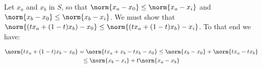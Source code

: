   Let $x_a$ and $x_b$ in $S$, so that $\norm{x_a - x_0} \leq \norm{x_a-x_i}$ and  $\norm{x_b - x_0} \leq \norm{x_b-x_i}$. We must show that $\norm{(tx_a + (1-t)x_b) - x_0} \leq  \norm{(tx_a + (1-t)x_b)-x_i}$. To that end we have:

\begin{gather*}
  \norm{tx_a + (1-t)x_b - x_0} = \norm{tx_a+x_b - tx_b -x_0} \leq \norm{x_b-x_0} + \norm{tx_a-tx_b} \\
  \leq \norm{x_b-x_i} + t\norm{x_a-x_b}\\
\end{gather*}
